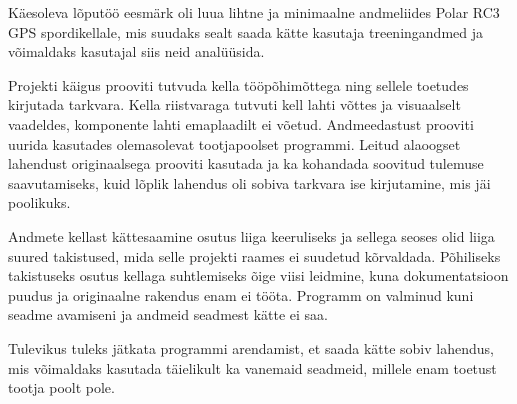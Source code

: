 Käesoleva lõputöö eesmärk oli luua lihtne ja minimaalne andmeliides Polar RC3 GPS spordikellale, mis suudaks sealt saada kätte kasutaja treeningandmed ja võimaldaks kasutajal siis neid analüüsida.

Projekti käigus prooviti tutvuda kella tööpõhimõttega ning sellele toetudes kirjutada tarkvara.
Kella riistvaraga tutvuti kell lahti võttes ja visuaalselt vaadeldes, komponente lahti emaplaadilt ei võetud.
Andmeedastust prooviti uurida kasutades olemasolevat tootjapoolset programmi.
Leitud alaoogset lahendust originaalsega prooviti kasutada ja ka kohandada soovitud tulemuse saavutamiseks, kuid lõplik lahendus oli sobiva tarkvara ise kirjutamine, mis jäi poolikuks.

Andmete kellast kättesaamine osutus liiga keeruliseks ja sellega seoses olid liiga suured takistused, mida selle projekti raames ei suudetud kõrvaldada.
Põhiliseks takistuseks osutus kellaga suhtlemiseks õige viisi leidmine, kuna dokumentatsioon puudus ja originaalne rakendus enam ei tööta.
Programm on valminud kuni seadme avamiseni ja andmeid seadmest kätte ei saa.

Tulevikus tuleks jätkata programmi arendamist, et saada kätte sobiv lahendus, mis võimaldaks kasutada täielikult ka vanemaid seadmeid, millele enam toetust tootja poolt pole.